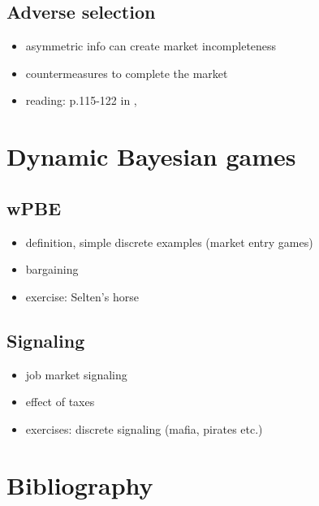 \documentclass[11pt]{article}
\begin{document}
\subsection{Adverse selection}
\label{sec:org0ad1b25}
\begin{itemize}
\item asymmetric info can create market incompleteness
\item countermeasures to complete the market
\item reading:  p.115-122 in \cite{einav2011selection}, \cite{Ake70}
\end{itemize}
\section{Dynamic Bayesian games}
\label{sec:org22c5264}
\subsection{wPBE}
\label{sec:orgac92d4d}
\begin{itemize}
\item definition, simple discrete examples (market entry games)
\item bargaining
\item exercise: Selten's horse
\end{itemize}
\subsection{Signaling}
\label{sec:org0e5d101}
\begin{itemize}
\item job market signaling
\item effect of taxes
\item exercises: discrete signaling (mafia, pirates etc.)
\end{itemize}

\section{Bibliography}
\label{sec:org910dd11}


\end{document}

